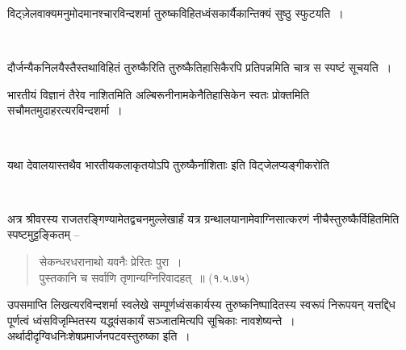 विट्ज़ेलवाक्यमनुमोदमानश्चारविन्दशर्मा तुरुष्कविहितध्वंसकार्यैकान्तिक्यं सुष्ठु स्फुटयति~।

\begin{myquote}

~\hfill {}
\end{myquote}

दौर्जन्यैकनिलयैस्तैस्तथाविहितं तुरुष्कैरिति तुरुष्कैतिहासिकैरपि प्रतिपन्नमिति चात्र स स्पष्टं सूचयति~।

भारतीयं विज्ञानं तैरेव नाशितमिति अल्बिरूनीनामकेनैतिहासिकेन स्वतः प्रोक्तमिति सचौमतमुदाहरत्यरविन्दशर्मा~।

\begin{myquote}

~\hfill {}
\end{myquote}

यथा देवालयास्तथैव भारतीयकलाकृतयोऽपि तुरुष्कैर्नाशिताः इति विट्जेलप्यङ्गीकरोति

\begin{myquote}

~\hfill {}
\end{myquote}

अत्र श्रीवरस्य राजतरङ्गिण्यामेतद्वचनमुल्लेखार्हं यत्र ग्रन्थालयानामेवाग्निसात्करणं नीचैस्तुरुष्कैर्विहितमिति स्पष्टमुट्टङ्कितम् –

\begin{verse}
सेकन्धरधरानाथो यवनैः प्रेरितः पुरा~।\\ पुस्तकानि च सर्वाणि तृणान्यग्निरिवादहत्~॥ (१.५.७५)
\end{verse}

उपसमाप्ति लिखत्यरविन्दशर्मा स्वलेखे सम्पूर्णध्वंसकार्यस्य तुरुष्कनिष्पादितस्य स्वरूपं निरूपयन् यत्तद्द्धि पूर्णत्वं ध्वंसविजृम्भितस्य यद्ध्वंसकार्यं सञ्जातमित्यपि सूचिकाः नावशेष्यन्ते~। अर्थादीदृग्विधनिःशेषप्रमार्जनपटवस्तुरुष्का इति~।

